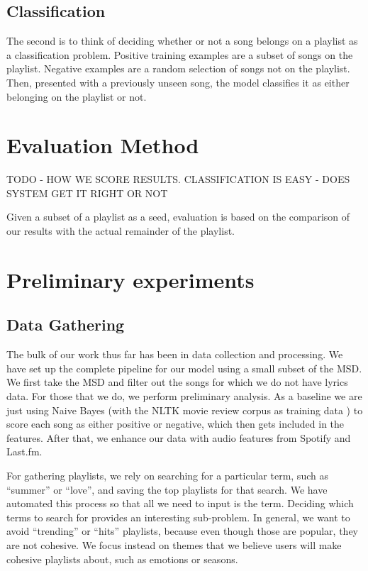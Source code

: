 \documentclass[10pt,journal,compsoc]{IEEEtran}
\begin{document}
\subsection{Classification}
The second is to think of deciding whether or not a song belongs on a playlist as a classification problem. Positive training examples are a subset of songs on the playlist. Negative examples are a random selection of songs not on the playlist. Then, presented with a previously unseen song, the model classifies it as either belonging on the playlist or not.

\section{Evaluation Method}
TODO - HOW WE SCORE RESULTS. CLASSIFICATION IS EASY - DOES SYSTEM GET IT RIGHT OR NOT

Given a subset of a playlist as a seed, evaluation is based on the comparison of our results with the actual remainder of the playlist.

\section{Preliminary experiments}

\subsection{Data Gathering}
The bulk of our work thus far has been in data collection and processing. We have set up the complete pipeline for our model using a small subset of the MSD. We first take the MSD and filter out the songs for which we do not have lyrics data. For those that we do, we perform preliminary analysis. As a baseline we are just using Naive Bayes (with the NLTK movie review corpus as training data \cite{nltk}) to score each song as either positive or negative, which then gets included in the features. After that, we enhance our data with audio features from Spotify and Last.fm.

For gathering playlists, we rely on searching for a particular term, such as ``summer'' or ``love'', and saving the top playlists for that search. We have automated this process so that all we need to input is the term. Deciding which terms to search for provides an interesting sub-problem. In general, we want to avoid ``trending'' or ``hits'' playlists, because even though those are popular, they are not cohesive. We focus instead on themes that we believe users will make cohesive playlists about, such as emotions or seasons.
\end{document}
